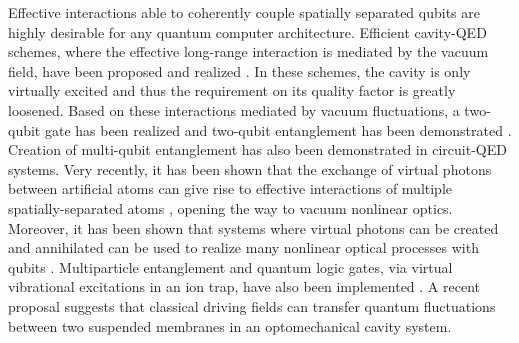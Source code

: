 \documentclass[aps,pra,twocolumn,floatfix,longbibliography, superscriptaddress]{revtex4-1}
\begin{document}
	
	Effective interactions able to coherently couple spatially separated qubits  \cite{Majer2007} are highly desirable  for any quantum computer architecture. 
	Efficient cavity-QED schemes, where the effective long-range interaction is mediated by the vacuum field, have been proposed \cite{Sorensen1999,Imamoglu1999, Zheng2000} and realized \cite{osnaghi2001,Majer2007,filipp2011}. In these schemes, the cavity is only virtually excited and thus the requirement on its quality factor is greatly loosened.
	Based on these interactions mediated by vacuum fluctuations, a two-qubit gate has been realized \cite{DiCarlo2009} and  two-qubit entanglement has been demonstrated \cite{Majer2007}. Creation of multi-qubit entanglement \cite{Neeley2010,Neeley2010} has also been demonstrated in circuit-QED systems. 
	Very recently, it has been shown that  the exchange of virtual photons between artificial atoms can give rise to effective interactions of multiple spatially-separated atoms \cite{Stassi2017, Zhao2017}, opening the way to vacuum nonlinear optics. Moreover, it has been shown that systems where virtual photons can be created and annihilated can be used to realize many nonlinear optical processes with qubits \cite{Kockum2017, Kockum2017b}.
	Multiparticle entanglement and quantum logic gates, via virtual vibrational excitations in an ion trap,  have also been implemented \cite{Sackett2000, Leibfried2003}. 
	A recent proposal \cite{chen2018} suggests that classical driving fields can transfer quantum fluctuations between two suspended membranes in an optomechanical cavity system.
\end{document}
